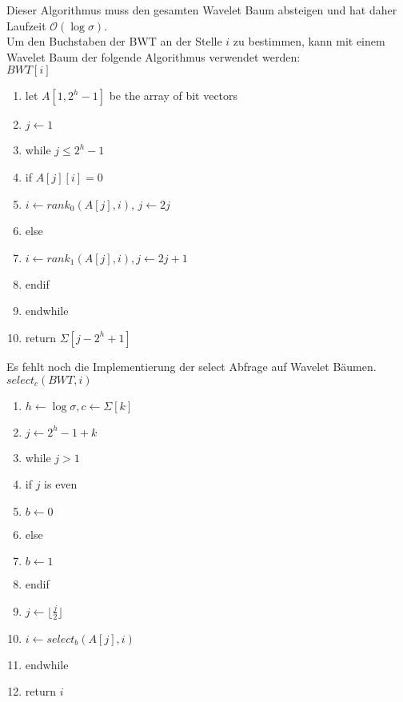 \documentclass[a4paper, 12pt]{article}
\theoremstyle{plain}
\theoremstyle{definition}
\theoremstyle{lemma}
\theoremstyle{remark}
\theoremstyle{corollary}
\theoremstyle{example}
\begin{document}
	Dieser Algorithmus muss den gesamten Wavelet Baum absteigen und hat daher Laufzeit $\mathcal{O}(\log \sigma)$.\\
	Um den Buchstaben der BWT an der Stelle $i$ zu bestimmen, kann mit einem Wavelet Baum der folgende Algorithmus verwendet werden:\\
	\underline{$BWT[i]$}
	\begin{enumerate}
		\item let $A[1,2^h-1]$ be the array of bit vectors
		\item $j\gets 1$
		\item while $j\leq 2^h-1$
		\item if $A[j][i] = 0$
		\item $i \gets rank_0(A[j],i)$, $j\gets 2j$
		\item else
		\item $i \gets rank_1(A[j],i), j \gets 2j+1$
		\item endif
		\item endwhile
		\item return $\Sigma[j-2^h+1]$
	\end{enumerate}
	Es fehlt noch die Implementierung der select Abfrage auf Wavelet Bäumen.\\
	\underline{$select_c(BWT,i)$}
	\begin{enumerate}
		\item $h\gets \log \sigma, c \gets \Sigma[k]$
		\item $j\gets 2^h-1+k$
		\item while $j >1$
		\item if $j$ is even
		\item $b\gets 0$
		\item else
		\item $b \gets 1$
		\item endif
		\item $j\gets \lfloor \frac{j}{2}\rfloor$
		\item $i \gets select_b(A[j],i)$
		\item endwhile
		\item return $i$
	\end{enumerate}
\end{document}
